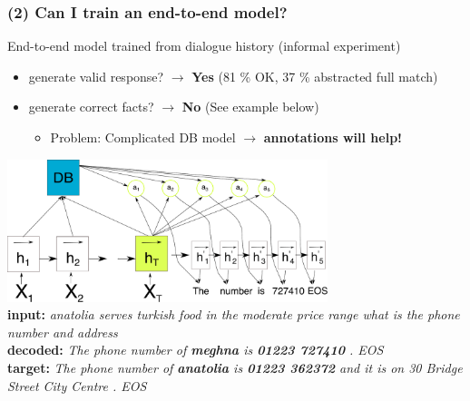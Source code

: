 \documentclass[10pt, compress,british,xcolor={svgnames,dvipsnames,x11names},trans]{beamer}
\begin{document}
\begin{frame}\frametitle{(2) Can I train an end-to-end model? }
    End-to-end model trained from dialogue history (informal experiment)
    \begin{itemize}
        \item generate valid response? $\longrightarrow$ {\bf Yes} {\footnotesize (81 \% OK, 37 \% abstracted full match)}
        \item generate correct facts? $\longrightarrow$ {\bf No} {\footnotesize (See example below)} 
            \begin{itemize}
                \item Problem: Complicated DB model $\longrightarrow$ {\bf annotations will help!}
            \end{itemize}
    \end{itemize}
    \includegraphics[width=0.7\textwidth]{./encdecdb.pdf} \\
    \vfill
    {\footnotesize
    {\bf input:} {\it anatolia serves turkish food in the moderate price range what is the phone number and address} \\
    {\bf decoded:} {\it The phone number of {\bf meghna} is {\bf 01223 727410} . EOS} \\
    {\bf target:} {\it The phone number of {\bf anatolia} is {\bf 01223 362372} and it is on 30 Bridge Street City Centre . EOS } \\
    }
\end{frame}
\end{document}
